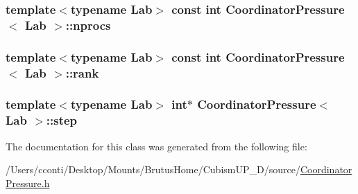 \subsubsection[{nprocs}]{\setlength{\rightskip}{0pt plus 5cm}template$<$typename Lab$>$ const int {\bf Coordinator\+Pressure}$<$ Lab $>$\+::nprocs\hspace{0.3cm}{\ttfamily [protected]}}\label{class_coordinator_pressure_ae31ae2e6b1f6a95fb7be1af288adce4e}
\hypertarget{class_coordinator_pressure_a3e290fd1625b1f5940831c4c8ead738c}{}
\subsubsection[{rank}]{\setlength{\rightskip}{0pt plus 5cm}template$<$typename Lab$>$ const int {\bf Coordinator\+Pressure}$<$ Lab $>$\+::rank\hspace{0.3cm}{\ttfamily [protected]}}\label{class_coordinator_pressure_a3e290fd1625b1f5940831c4c8ead738c}
\hypertarget{class_coordinator_pressure_aaba2b69d08c12a6358baf7a4dd0d8666}{}
\subsubsection[{step}]{\setlength{\rightskip}{0pt plus 5cm}template$<$typename Lab$>$ int$\ast$ {\bf Coordinator\+Pressure}$<$ Lab $>$\+::step\hspace{0.3cm}{\ttfamily [protected]}}\label{class_coordinator_pressure_aaba2b69d08c12a6358baf7a4dd0d8666}


The documentation for this class was generated from the following file\+:\begin{DoxyCompactItemize}
\item 
/\+Users/cconti/\+Desktop/\+Mounts/\+Brutus\+Home/\+Cubism\+U\+P\+\_\+D/source/\hyperlink{_coordinator_pressure_8h}{Coordinator\+Pressure.\+h}\end{DoxyCompactItemize}
